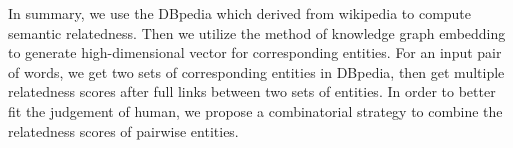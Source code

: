 In summary, we use the DBpedia which derived from wikipedia to compute semantic relatedness.
Then we utilize the method of knowledge graph embedding to generate high-dimensional vector for corresponding
entities. For an input pair of words, we get two sets of corresponding entities in DBpedia, then get multiple
relatedness scores after full links between two sets of entities.
In order to better fit the judgement of human, we propose a combinatorial strategy to combine
the relatedness scores of pairwise entities.

